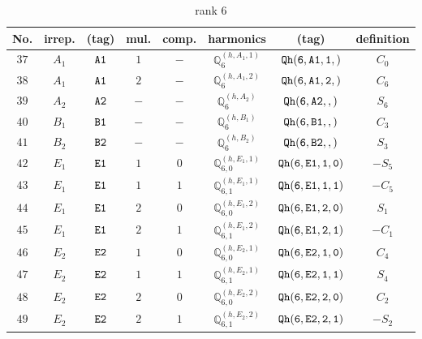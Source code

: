 \documentclass[fleqn,8pt]{jsarticle}
\begin{document}
\begin{table}[ht!]
\begin{center}
\caption{rank 6}
\renewcommand{\arraystretch}{1.3}
\begin{tabular}{cccccccc} \hline \hline
No. & irrep. & (tag) & mul. & comp. & harmonics & (tag) & definition \\ \hline
$ 37 $ & $ A_{1} $ & $ {\tt A1} $ & $ 1 $ & $ - $ & $ \mathbb{Q}_{6}^{(h,A_{1},1)} $ & $ {\tt Qh(6,A1,1,)} $ & $ C_{0} $ \\
$ 38 $ & $ A_{1} $ & $ {\tt A1} $ & $ 2 $ & $ - $ & $ \mathbb{Q}_{6}^{(h,A_{1},2)} $ & $ {\tt Qh(6,A1,2,)} $ & $ C_{6} $ \\
$ 39 $ & $ A_{2} $ & $ {\tt A2} $ & $ - $ & $ - $ & $ \mathbb{Q}_{6}^{(h,A_{2})} $ & $ {\tt Qh(6,A2,,)} $ & $ S_{6} $ \\
$ 40 $ & $ B_{1} $ & $ {\tt B1} $ & $ - $ & $ - $ & $ \mathbb{Q}_{6}^{(h,B_{1})} $ & $ {\tt Qh(6,B1,,)} $ & $ C_{3} $ \\
$ 41 $ & $ B_{2} $ & $ {\tt B2} $ & $ - $ & $ - $ & $ \mathbb{Q}_{6}^{(h,B_{2})} $ & $ {\tt Qh(6,B2,,)} $ & $ S_{3} $ \\
$ 42 $ & $ E_{1} $ & $ {\tt E1} $ & $ 1 $ & $ 0 $ & $ \mathbb{Q}_{6,0}^{(h,E_{1},1)} $ & $ {\tt Qh(6,E1,1,0)} $ & $ - S_{5} $ \\
$ 43 $ & $ E_{1} $ & $ {\tt E1} $ & $ 1 $ & $ 1 $ & $ \mathbb{Q}_{6,1}^{(h,E_{1},1)} $ & $ {\tt Qh(6,E1,1,1)} $ & $ - C_{5} $ \\
$ 44 $ & $ E_{1} $ & $ {\tt E1} $ & $ 2 $ & $ 0 $ & $ \mathbb{Q}_{6,0}^{(h,E_{1},2)} $ & $ {\tt Qh(6,E1,2,0)} $ & $ S_{1} $ \\
$ 45 $ & $ E_{1} $ & $ {\tt E1} $ & $ 2 $ & $ 1 $ & $ \mathbb{Q}_{6,1}^{(h,E_{1},2)} $ & $ {\tt Qh(6,E1,2,1)} $ & $ - C_{1} $ \\
$ 46 $ & $ E_{2} $ & $ {\tt E2} $ & $ 1 $ & $ 0 $ & $ \mathbb{Q}_{6,0}^{(h,E_{2},1)} $ & $ {\tt Qh(6,E2,1,0)} $ & $ C_{4} $ \\
$ 47 $ & $ E_{2} $ & $ {\tt E2} $ & $ 1 $ & $ 1 $ & $ \mathbb{Q}_{6,1}^{(h,E_{2},1)} $ & $ {\tt Qh(6,E2,1,1)} $ & $ S_{4} $ \\
$ 48 $ & $ E_{2} $ & $ {\tt E2} $ & $ 2 $ & $ 0 $ & $ \mathbb{Q}_{6,0}^{(h,E_{2},2)} $ & $ {\tt Qh(6,E2,2,0)} $ & $ C_{2} $ \\
$ 49 $ & $ E_{2} $ & $ {\tt E2} $ & $ 2 $ & $ 1 $ & $ \mathbb{Q}_{6,1}^{(h,E_{2},2)} $ & $ {\tt Qh(6,E2,2,1)} $ & $ - S_{2} $ \\
 \hline \hline
\end{tabular}
\end{center}
\end{table}
\end{document}

